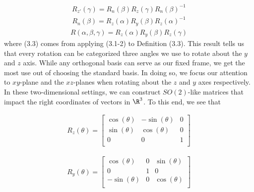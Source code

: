 \begin{equation}
	\begin{aligned}
		R_{z'}(\gamma) = R_n(\beta)R_z(\gamma)R_n(\beta)^{-1}
	\end{aligned}
\end{equation}
\begin{equation}
	\begin{aligned}
		R_n(\beta) = R_z(\alpha)R_y(\beta)R_z(\alpha)^{-1}
	\end{aligned}
\end{equation}
\begin{equation}
	\begin{aligned}
		R(\alpha,\beta,\gamma) = R_z(\alpha)R_y(\beta)R_z(\gamma)
	\end{aligned}
\end{equation}
where (3.3) comes from applying (3.1-2) to Definition (3.3). This result tells us that every rotation can be categorized three angles we use to rotate about the $y$ and $z$ axis. While any orthogonal basis can serve as our fixed frame, we get the most use out of choosing the standard basis. In doing so, we focus our attention to $xy$-plane and the $xz$-planes when rotating about the $z$ and $y$ axes respectively. In these two-dimensional settings, we can construct $SO(2)$-like matrices that impact the right coordinates of vectors in $\R^3$. To this end, we see that

\begin{equation}
	\begin{aligned}
		R_z(\theta) = \begin{bmatrix}
						\cos(\theta) & -\sin(\theta) & 0 \\
						\sin(\theta) & \cos(\theta) & 0 \\
						0 & 0 & 1 \\
						\end{bmatrix}
	\end{aligned}
\end{equation}

\begin{equation}
	\begin{aligned}
		R_y(\theta) = \begin{bmatrix}
						\cos(\theta) & 0& \sin(\theta) \\
						0 & 1 & 0 \\
						-\sin(\theta) &0& \cos(\theta) \\
						\end{bmatrix}
	\end{aligned}
\end{equation}

